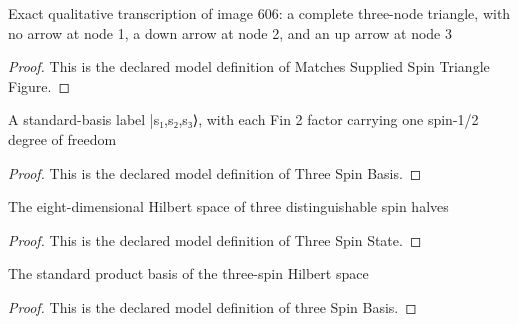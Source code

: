 \begin{definition}
  \label{def:physics:phyx-mini-0606:phyxminiproblems-problemphyxmini0606-matchessuppliedspintrianglefigure}
  Exact qualitative transcription of image 606: a complete three-node triangle, with no arrow at node 1, a down arrow at node 2, and an up arrow at node 3
\end{definition}
\begin{proof}
  This is the declared model definition of Matches Supplied Spin Triangle Figure.
\end{proof}
\begin{definition}
  \label{def:physics:phyx-mini-0606:phyxminiproblems-problemphyxmini0606-threespinbasis}
  A standard-basis label |s₁,s₂,s₃⟩, with each Fin 2 factor carrying one spin-1/2 degree of freedom
\end{definition}
\begin{proof}
  This is the declared model definition of Three Spin Basis.
\end{proof}
\begin{definition}
  \label{def:physics:phyx-mini-0606:phyxminiproblems-problemphyxmini0606-threespinstate}
  The eight-dimensional Hilbert space of three distinguishable spin halves
\end{definition}
\begin{proof}
  This is the declared model definition of Three Spin State.
\end{proof}
\begin{definition}
  \label{def:physics:phyx-mini-0606:phyxminiproblems-problemphyxmini0606-threespinbasis-value}
  The standard product basis of the three-spin Hilbert space
\end{definition}
\begin{proof}
  This is the declared model definition of three Spin Basis.
\end{proof}
